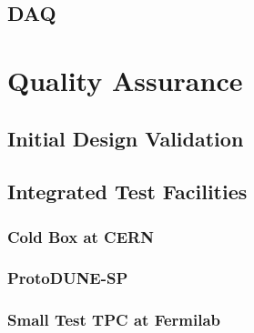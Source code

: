 \subsection{DAQ}
\label{sec:fdsp-tpc-elec-intfc-daq}



\section{Quality Assurance}
\label{sec:fdsp-tpc-elec-qa}


\subsection{Initial Design Validation}
\label{sec:fdsp-tpc-elec-qa-initial}


\subsection{Integrated Test Facilities}
\label{sec:fdsp-tpc-elec-qa-facilities}


\subsubsection{Cold Box at CERN}
\label{sec:fdsp-tpc-elec-qa-facilities-coldbox}


\subsubsection{ProtoDUNE-SP}
\label{sec:fdsp-tpc-elec-qa-facilities-pdune}


\subsubsection{Small Test TPC at Fermilab}
\label{sec:fdsp-tpc-elec-qa-facilities-small}


